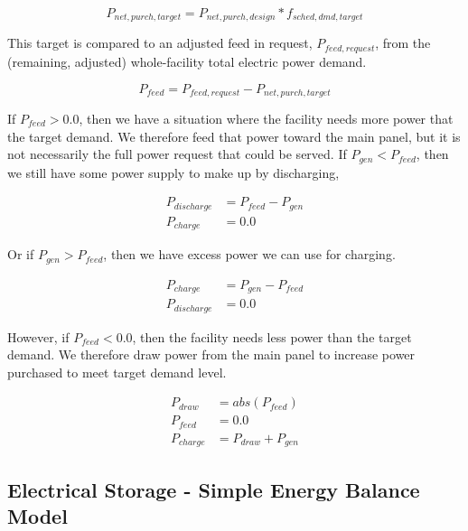 \begin{equation}
  {P_{net,purch,target}} = {P_{net,purch,design}} *{f_{sched,dmd,target}}
\end{equation}

This target is compared to an adjusted feed in request, $ {P_{feed, request}}  $, from the (remaining, adjusted) whole-facility total electric power demand. 

\begin{equation}
  {P_{feed}} = {P_{feed,request}} - {P_{net,purch,target}}
\end{equation}

If $ {P_{feed}} > 0.0 $, then we have a situation where the facility needs more power that the target demand.  We therefore feed that power toward the main panel, but it is not necessarily the full power request that could be served.  If $ {P_{gen}} < {P_{feed}} $, then we still have some power supply to make up by discharging,

\begin{equation}
  \begin{array}{rl}
    {P_{discharge}} &=  {P_{feed}} - {P_{gen}} \\
    {P_{charge}} &= 0.0
  \end{array}
\end{equation}

Or if $ {P_{gen}} > {P_{feed}} $,  then we have excess power we can use for charging.

\begin{equation}
  \begin{array}{rl}
    {P_{charge}} &= {P_{gen}} - {P_{feed}} \\
    {P_{discharge}} &= 0.0
  \end{array}
\end{equation}

However, if $ {P_{feed}} < 0.0 $, then the facility needs less power than the target demand.  We therefore draw power from the main panel to increase power purchased to meet target demand level. 

\begin{equation}
  \begin{array}{rl}
   {P_{draw}} &= { abs( {P_{feed}} )} \\
    {P_{feed}} &= 0.0 \\
    {P_{charge}} &= {P_{draw}} + {P_{gen}}
  \end{array}
\end{equation}

\subsection{Electrical Storage - Simple Energy Balance Model}

